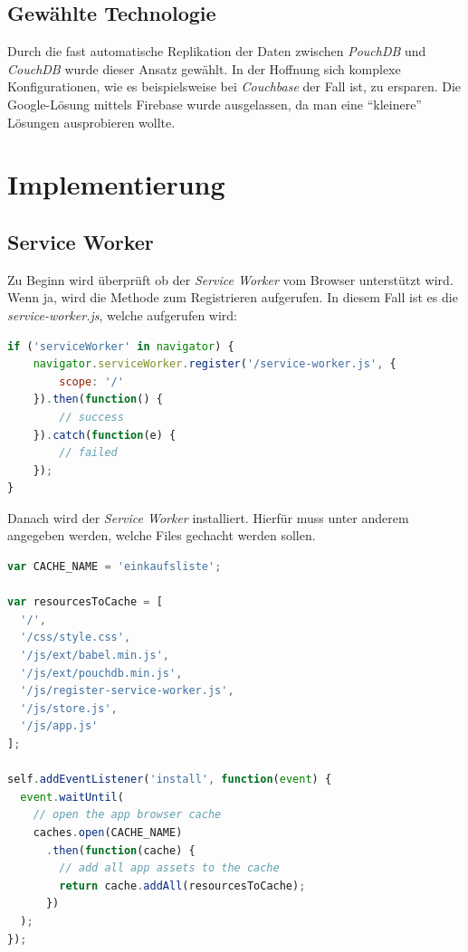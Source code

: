 

\subsection{Gewählte Technologie}

Durch die fast automatische Replikation der Daten zwischen \textit{PouchDB} und \textit{CouchDB} wurde dieser Ansatz gewählt. In der Hoffnung sich komplexe Konfigurationen, wie es beispielsweise bei \textit{Couchbase} der Fall ist, zu ersparen. Die Google-Lösung mittels Firebase wurde ausgelassen, da man eine \enquote{kleinere} Lösungen ausprobieren wollte.

\section{Implementierung}

\subsection{Service Worker}

Zu Beginn wird überprüft ob der \textit{Service Worker} vom Browser unterstützt wird. Wenn ja, wird die Methode zum Registrieren aufgerufen. In diesem Fall ist es die \textit{service-worker.js}, welche aufgerufen wird:

\begin{lstlisting}[language=JavaScript]
if ('serviceWorker' in navigator) {
    navigator.serviceWorker.register('/service-worker.js', {
        scope: '/'
    }).then(function() {
        // success
    }).catch(function(e) {
        // failed
    });
}

\end{lstlisting}

Danach wird der \textit{Service Worker} installiert. Hierfür muss unter anderem angegeben werden, welche Files gechacht werden sollen.

\begin{lstlisting}[language=JavaScript]
var CACHE_NAME = 'einkaufsliste';

var resourcesToCache = [
  '/',
  '/css/style.css',
  '/js/ext/babel.min.js',
  '/js/ext/pouchdb.min.js',
  '/js/register-service-worker.js',
  '/js/store.js',
  '/js/app.js'
];

self.addEventListener('install', function(event) {
  event.waitUntil(
    // open the app browser cache
    caches.open(CACHE_NAME)
      .then(function(cache) {
        // add all app assets to the cache
        return cache.addAll(resourcesToCache);
      })
  );
});

\end{lstlisting}

